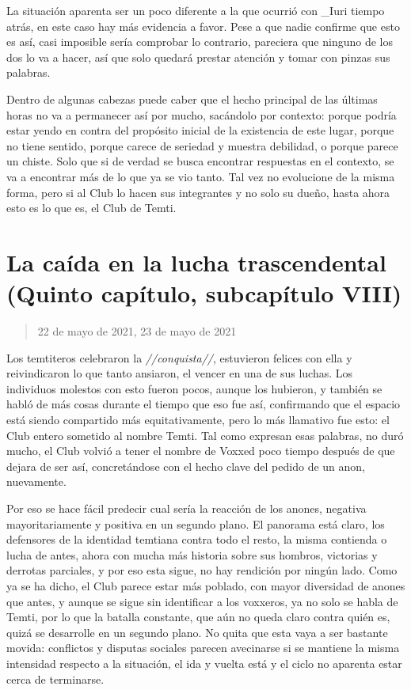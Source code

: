 \documentclass[
  spanish,
]{book}
\begin{document}
La situación aparenta ser un poco diferente a la que ocurrió con \_Iuri tiempo atrás, en este caso hay más evidencia a favor. Pese a que nadie confirme que esto es así, casi imposible sería comprobar lo contrario, pareciera que ninguno de los dos lo va a hacer, así que solo quedará prestar atención y tomar con pinzas sus palabras.

Dentro de algunas cabezas puede caber que el hecho principal de las últimas horas no va a permanecer así por mucho, sacándolo por contexto: porque podría estar yendo en contra del propósito inicial de la existencia de este lugar, porque no tiene sentido, porque carece de seriedad y muestra debilidad, o porque parece un chiste. Solo que si de verdad se busca encontrar respuestas en el contexto, se va a encontrar más de lo que ya se vio tanto. Tal vez no evolucione de la misma forma, pero si al Club lo hacen sus integrantes y no solo su dueño, hasta ahora esto es lo que es, el Club de Temti.

\hypertarget{la-cauxedda-en-la-lucha-trascendental-quinto-capuxedtulo-subcapuxedtulo-viii}{%
\section{La caída en la lucha trascendental (Quinto capítulo, subcapítulo VIII)}\label{la-cauxedda-en-la-lucha-trascendental-quinto-capuxedtulo-subcapuxedtulo-viii}}

\begin{quote}
22 de mayo de 2021, 23 de mayo de 2021
\end{quote}

Los temtiteros celebraron la \emph{//conquista//}, estuvieron felices con ella y reivindicaron lo que tanto ansiaron, el vencer en una de sus luchas. Los individuos molestos con esto fueron pocos, aunque los hubieron, y también se habló de más cosas durante el tiempo que eso fue así, confirmando que el espacio está siendo compartido más equitativamente, pero lo más llamativo fue esto: el Club entero sometido al nombre Temti. Tal como expresan esas palabras, no duró mucho, el Club volvió a tener el nombre de Voxxed poco tiempo después de que dejara de ser así, concretándose con el hecho clave del pedido de un anon, nuevamente.

Por eso se hace fácil predecir cual sería la reacción de los anones, negativa mayoritariamente y positiva en un segundo plano. El panorama está claro, los defensores de la identidad temtiana contra todo el resto, la misma contienda o lucha de antes, ahora con mucha más historia sobre sus hombros, victorias y derrotas parciales, y por eso esta sigue, no hay rendición por ningún lado. Como ya se ha dicho, el Club parece estar más poblado, con mayor diversidad de anones que antes, y aunque se sigue sin identificar a los voxxeros, ya no solo se habla de Temti, por lo que la batalla constante, que aún no queda claro contra quién es, quizá se desarrolle en un segundo plano. No quita que esta vaya a ser bastante movida: conflictos y disputas sociales parecen avecinarse si se mantiene la misma intensidad respecto a la situación, el ida y vuelta está y el ciclo no aparenta estar cerca de terminarse.
\end{document}
